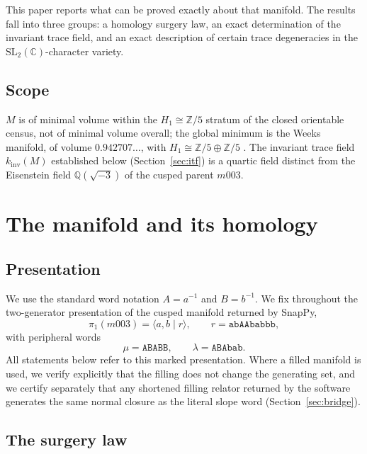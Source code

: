 \documentclass[11pt,a4paper]{article}
\theoremstyle{definition}
\theoremstyle{remark}
\newcommand{\kinv}{k_{\mathrm{inv}}}
\newcommand{\SLtwo}{\mathrm{SL}_2(\mathbb{C})}
\newcommand{\Zfive}{\mathbb{Z}/5}
\newcommand{\Q}{\mathbb{Q}}
\begin{document}
This paper reports what can be proved exactly about that manifold.
The results fall into three groups: a homology surgery law, an exact
determination of the invariant trace field, and an exact description
of certain trace degeneracies in the $\SLtwo$-character variety.

\subsection{Scope}

$M$ is of minimal volume within the $H_1 \cong \Zfive$ stratum of the
closed orientable census, not of minimal volume overall; the global
minimum is the Weeks manifold, of volume $0.942707\ldots$, with
$H_1 \cong \Zfive \oplus \Zfive$ \cite{GMM2009}. The invariant trace
field $\kinv(M)$ established below (Section~\ref{sec:itf}) is a
quartic field distinct from the Eisenstein field $\Q(\sqrt{-3})$ of
the cusped parent $m003$.

\section{The manifold and its homology}
\label{sec:homology}

\subsection{Presentation}

We use the standard word notation $A = a^{-1}$ and $B = b^{-1}$. We
fix throughout the two-generator presentation of the cusped
manifold returned by SnapPy,
\begin{equation}
\pi_1(m003) = \langle a, b \mid r \rangle,
\qquad r = \texttt{abAAbabbb},
\end{equation}
with peripheral words
\begin{equation}
\mu = \texttt{ABABB}, \qquad \lambda = \texttt{ABAbab} .
\end{equation}
All statements below refer to this marked presentation. Where a filled
manifold is used, we verify explicitly that the filling does not
change the generating set, and we certify separately that any
shortened filling relator returned by the software generates the same
normal closure as the literal slope word (Section~\ref{sec:bridge}).

\subsection{The surgery law}
\end{document}
